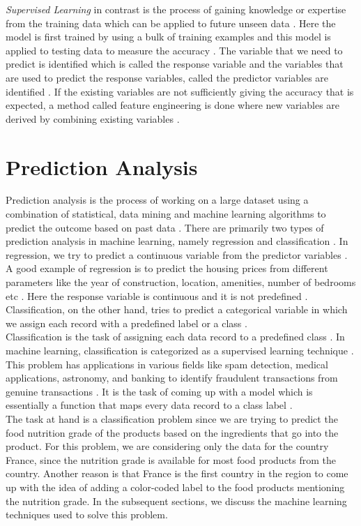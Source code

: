 \documentclass[sigconf]{acmart}
\begin{document}
{\em Supervised Learning} in contrast is the process of gaining knowledge or expertise from the training data which can be applied to future unseen data \cite{book-shai}. Here the model is first trained by using a bulk of training examples and this model is applied to testing data to measure the accuracy \cite{book-shai}. The variable that we need to predict is identified which is called the response variable and the variables that are used to predict the response variables, called the predictor variables are identified \cite{book-shai}. If the existing variables are not sufficiently giving the accuracy that is expected, a method called feature engineering is done where new variables are derived by combining existing variables \cite{book-shai}. 

\section{Prediction Analysis}
Prediction analysis is the process of working on a large dataset using a combination of statistical, data mining and machine learning algorithms to predict the outcome based on past data \cite{book-shai}.
There are primarily two types of prediction analysis in machine learning, namely regression and classification \cite{book-tan}. In regression, we try to predict a continuous variable from the predictor variables \cite{book-tan}. A good example of regression is to predict the housing prices from different parameters like the year of construction, location, amenities, number of bedrooms etc \cite{book-tan}. Here the response variable is continuous and it is not predefined \cite{book-tan}. Classification, on the other hand, tries to predict a categorical variable in which we assign each record with a predefined label or a class \cite{book-tan}. \\

Classification is the task of assigning each data record to a predefined class \cite{book-tan}. In machine learning, classification is categorized as a supervised learning technique \cite{book-tan}. This problem has applications in various fields like spam detection, medical applications, astronomy, and banking to identify fraudulent transactions from genuine transactions \cite{book-tan}. It is the task of coming up with a model which is essentially a function that maps every data record to a class label \cite{book-tan}. \\ 

The task at hand is a classification problem since we are trying to predict the food nutrition grade of the products based on the ingredients that go into the product. For this problem, we are considering only the data for the country France, since the nutrition grade is available for most food products from the country. Another reason is that France is the first country in the region to come up with the idea of adding a color-coded label to the food products mentioning the nutrition grade. In the subsequent sections, we discuss the machine learning techniques used to solve this problem.
\end{document}
